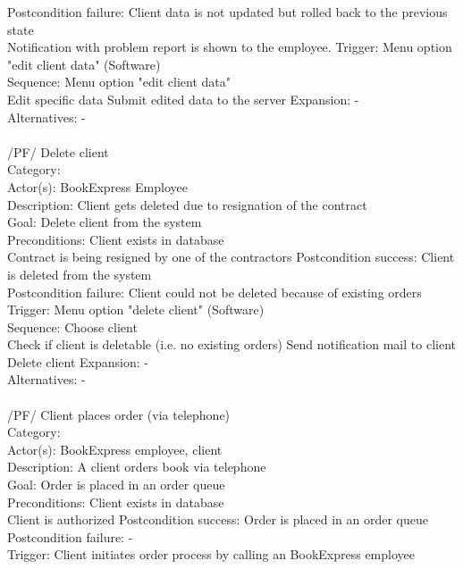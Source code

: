 \documentclass[11pt,a4paper,oneside,svgnames,draft]{report}
\begin{document}
\begin{tabbing}
	 Postcondition failure: \> Client data is not updated but rolled back to the previous state\\
	 \> Notification with problem report is shown to the employee.
	 Trigger: \> Menu option "edit client data" (Software)\\
	 Sequence: \> Menu option "edit client data"\\
	 \> Edit specific data
	 \> Submit edited data to the server
	 Expansion: \> -\\
	 Alternatives: \> -\\
	 \\
	 /PF/ \> Delete client\\ 
	 Category: \> \\
	 Actor(s): \> BookExpress Employee\\ 
	 Description: \> Client gets deleted due to resignation of the contract\\ 
	 Goal: \> Delete client from the system\\
	 Preconditions: \> Client exists in database\\
	 \> Contract is being resigned by one of the contractors
	 Postcondition success: \> Client is deleted from the system\\
	 Postcondition failure: \> Client could not be deleted because of existing orders\\
	 Trigger: \> Menu option "delete client" (Software)\\
	 Sequence: \> Choose client\\
	 \> Check if client is deletable (i.e. no existing orders)
	 \> Send notification mail to client
	 \> Delete client
	 Expansion: \> -\\
	 Alternatives: \> -\\
	 \\
	 /PF/ \> Client places order (via telephone)\\ 
	 Category: \> \\
	 Actor(s): \> BookExpress employee, client\\ 
	 Description: \> A client orders book via telephone\\ 
	 Goal: \> Order is placed in an order queue\\
	 Preconditions: \> Client exists in database\\
	 \> Client is authorized
	 Postcondition success: \> Order is placed in an order queue\\
	 Postcondition failure: \> -\\
	 Trigger: \> Client initiates order process by calling an BookExpress employee\\

\end{tabbing}
\end{document}
